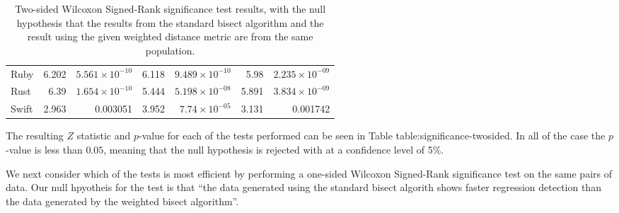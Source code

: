 \documentclass[10pt,journal,compsoc]{IEEEtran}
\begin{document}
\begin{table*}[t!]
\begin{center}
\begin{tabular}{l | r r | r r | r r}
Ruby & 6.202 & $5.561 \times 10^{-10}$ & 6.118 & $9.489 \times 10^{-10}$ & 5.98 & $2.235 \times 10^{-09}$ \\
Rust & 6.39 & $1.654 \times 10^{-10}$ & 5.444 & $5.198 \times 10^{-08}$ & 5.891 & $3.834 \times 10^{-09}$ \\
Swift & 2.963 & 0.003051 & 3.952 & $7.74 \times 10^{-05}$ & 3.131 & 0.001742 \\
\end{tabular}
\caption{\label{table:significance-twosided}Two-sided Wilcoxon Signed-Rank significance test results, with the null hypothesis that the results from the standard bisect algorithm and the result using the given weighted distance metric are from the same population.}
\end{center}
\end{table*}

The resulting $Z$ statistic and $p$-value for each of the tests performed can be seen in Table table:significance-twosided. In all of the case the $p$-value is less than $0.05$, meaning that the null hypothesis is rejected with at a confidence level of 5\%.

We next consider which of the tests is most efficient by performing a one-sided Wilcoxon Signed-Rank significance test on the same pairs of data. Our null hpyotheis for the test is that ``the data generated using the standard bisect algorith shows faster regression detection than the data generated by the weighted bisect algorithm''.
\end{document}
